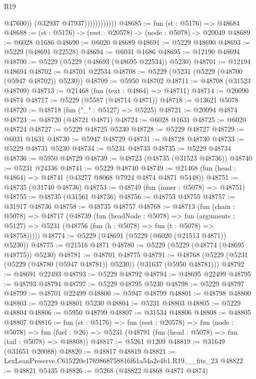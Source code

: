 \begin{lexlean}{R19}
\begin{coremodule}
                              @47600))
                          (@32937 @47937))))))))))))
@48685 := fun (st : @5176) => @48684
@48688 := (st : @5176) -> (rest : @20578) -> (node : @5078) -> @20049
@48689 := @6028 @1686
@48690 := @6020 @48689
@48691 := @5229 @48690
@48693 := @5229 (@48691 @22528)
@48694 := @6031 @1686
@48695 := @12190 @48694
@48700 := @5229 (@5229 (@48693 (@48695 @22534)) @5230)
@48701 := @12194 @48694
@48702 := @48701 @22534
@48708 := @5229 (@5231 (@5229 (@48700 (@5947 @48702)) @5230))
@48709 := @5950 @48702
@48711 := @48708 (@31523 @48709)
@48713 := @21468 (fun (text : @4864) => @48711)
@48714 := @20090 @4874
@48717 := @5229 (@5587 (@48714 @4871))
@48718 := @13621 @5078
@48720 := @48718 (fun ("_" : @5127) => @5225)
@48721 := @20094 @4874
@48723 := @48720 (@48721 @4871)
@48724 := @6028 @1631
@48725 := @6020 @48724
@48727 := @5229 @48725 @5230
@48728 := @5229 @48727
@48729 := @6031 @1631
@48730 := @5947 @48729
@48731 := @48728 @48730
@48733 := @5229 @48731 @5230
@48734 := @5231 @48733
@48735 := @5229 @48734
@48736 := @5950 @48729
@48739 := @48723 (@48735 (@31523 @48736))
@48740 := @5231 @24336
@48741 := @5229 @48740
@48749 := @21468 (fun (head : @4864) => @48741 (@43277 @8068 @7924 @4874 @4871 @5448))
@48751 := @48735 (@31740 @48736)
@48753 := @48749 (fun (inner : @5078) => @48751)
@48755 := @48735 (@31561 @48736)
@48756 := @48753 @48755
@48757 := @31917 @48736
@48758 := @48735 @48757
@48768 := @48713
    (fun (chain : @5078) =>
    @48717
      (@48739
        (fun (headNode : @5078) =>
        fun (arguments : @5127) => @5231 (@48756 (fun (h : @5078) => fun (t : @5078) => @48758)))))
@48774 := @5229 (@48691 (@5229 (@6020 (@21513 @4871)) @5230))
@48775 := @21516 @4871
@48780 := @5229 (@5229 (@48774 (@48695 @48775)) @5230)
@48781 := @48701 @48775
@48791 := @48768 (@5229 (@5231 (@5229 (@48780 (@5947 @48781)) @5230)) (@31637 (@5950 @48781)))
@48792 := @48691 @22493
@48793 := @5229 @48792
@48794 := @48695 @22499
@48795 := @48793 @48794
@48797 := @5229 @48795 @5230
@48798 := @5229 @48797
@48799 := @48701 @22499
@48800 := @5947 @48799
@48801 := @48798 @48800
@48803 := @5229 @48801 @5230
@48804 := @5231 @48803
@48805 := @5229 @48804
@48806 := @5950 @48799
@48807 := @31534 @48806
@48808 := @48805 @48807
@48816 := fun (st : @5176) =>
  fun (rest : @20578) =>
  fun (node : @5078) =>
  fun (fuel : @26) => @5231 (@48791 (fun (head : @5078) => fun (tail : @5078) => @48808))
@48817 := @5261 @1209
@48819 := @31649 (@31651 @20088)
@48820 := @48817 @48819
@48821 := LexLeanPreserve.C615220e1769868758816f61a54a2e4b1.R19.__fits_23
@48822 := @48821 @5435
@48826 := @5268 (@48822 @4868 @4871 @4874)

\end{coremodule}
\end{lexlean}
